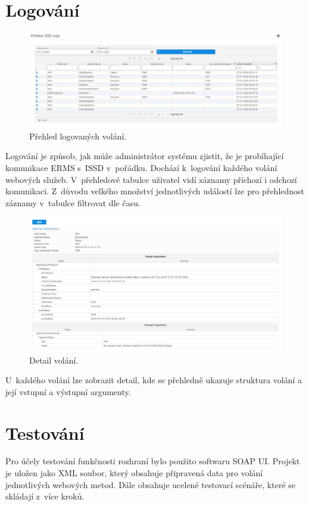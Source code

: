 \documentclass[
  master,
  field=ainfp,
  biblatex,
  language=czech,
  glossaries,
  theorems=false,
  index
]{kidiplom}
\begin{document}
\section{Logování}
\begin{figure}[h]
  \centerline{\includegraphics[width=0.9\linewidth]{./images/LogovaniWeb.png}} 
  \caption{Přehled logovaných volání.} 
\end{figure}
Logování je způsob, jak může administrátor systému zjistit, že je probíhající komunikace ERMS s~ISSD v~pořádku. Dochází k~logování každého volání webových služeb. V~přehledové tabulce uživatel vidí záznamy příchozí i odchozí komunikaci. Z~důvodu velkého množství jednotlivých událostí lze pro přehlednost záznamy v~tabulce filtrovat dle času.
\begin{figure}[h]
  \centerline{\includegraphics[width=0.9\linewidth]{./images/LogovaniWebDetail.png}} 
  \caption{Detail volání.} 
\end{figure}
U~každého volání lze zobrazit detail, kde se přehledně ukazuje struktura volání a její vstupní a výstupní argumenty.

\newpage
\section{Testování}
Pro účely testování funkčnosti rozhraní bylo použito softwaru SOAP UI. Projekt je uložen jako XML soubor, který obsahuje připravená data pro volání jednotlivých webových metod. Dále obsahuje ucelené testovací scénáře, které se skládají z~více kroků.
\end{document}
